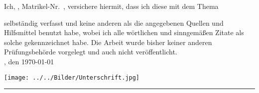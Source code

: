 \clearpage
{}
Ich, \autor, Matrikel-Nr.\ \matrikelnr, versichere hiermit, dass ich diese \art{} mit dem Thema
\begin{quote}
\textit{\titel} \textit{\untertitel}
\end{quote}
selbständig verfasst und keine anderen als die angegebenen Quellen und Hilfsmittel benutzt habe, wobei ich alle 
wörtlichen und sinngemäßen Zitate als solche gekennzeichnet habe. Die Arbeit wurde bisher keiner anderen 
Prüfungsbehörde vorgelegt und auch nicht veröffentlicht.\\[6ex]

\ort, den \today

\texttt{[image: ../../Bilder/Unterschrift.jpg]}

\rule[-0.2cm]{5cm}{0.5pt}

\textsc{\autor} 
